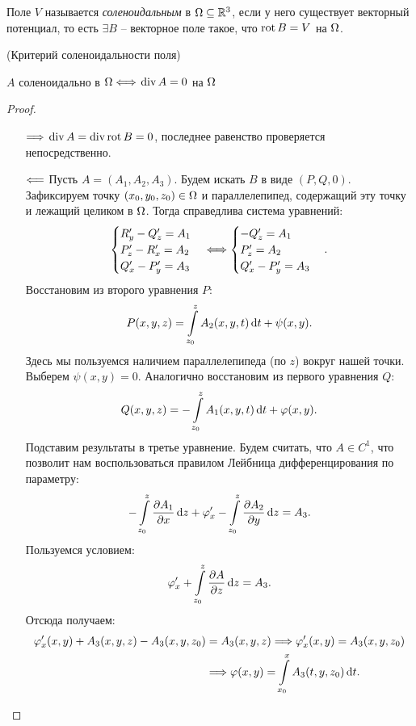 \begin{definition}
    Поле $V$ называется \textit{соленоидальным} в $\Omega \subseteq \mathbb{R}^3$, 
    если у него существует векторный потенциал, то есть
    $\exists B$ -- векторное поле такое, что $\operatorname{rot} B = V$ на $\Omega$.
\end{definition}

\begin{theorem}(Критерий соленоидальности поля)
    
    $A$ соленоидально в $\Omega \Longleftrightarrow$ $\operatorname{div} A = 0$ на $\Omega$
\end{theorem}
\begin{proof}
    \enewline
    \begin{itemize}
        \item[$\Longrightarrow$] $\operatorname{div}{A} = \operatorname{div}{\operatorname{rot}{B}} = 0$, последнее равенство проверяется непосредственно.
        \item[$\Longleftarrow$] Пусть $A = (A_1, A_2, A_3)$. Будем искать $B$ в виде $(P, Q, 0)$. Зафиксируем точку
            $(x_0, y_0, z_0) \in \Omega$ и параллелепипед, содержащий эту точку и лежащий целиком в $\Omega$.
            Тогда справедлива система уравнений:
            \[
                \begin{cases}
                    R'_y - Q'_z = A_1 \\
                    P'_z - R'_x = A_2 \\
                    Q'_x - P'_y = A_3 
                \end{cases} \Longleftrightarrow
                \begin{cases}
                    -Q'_z = A_1 \\
                    P'_z = A_2 \\
                    Q'_x - P'_y = A_3
                \end{cases}
            .\]
            Восстановим из второго уравнения $P$:
            \[
                P(x, y, z) = \int\limits_{z_0}^z{A_2(x, y, t) \,\mathrm{d} t} + \psi(x, y)
            .\]
            Здесь мы пользуемся наличием параллелепипеда (по $z$) вокруг нашей точки. Выберем $\psi(x, y) = 0$. 
            Аналогично восстановим из первого уравнения $Q$:
            \[
                Q(x, y, z) = -\int\limits_{z_0}^z{A_1(x, y, t) \,\mathrm{d} t} + \varphi(x, y)
            .\]
            Подставим результаты в третье уравнение. Будем считать, что $A \in C^1$, 
            что позволит нам воспользоваться правилом Лейбница дифференцирования по параметру:
            \[
                -\int\limits_{z_0}^z{\dfrac{\partial A_1}{\partial x} \,\mathrm{d} z} + \varphi'_x - \int\limits_{z_0}^z{\dfrac{\partial A_2}{\partial y} \,\mathrm{d} z} = A_3
            .\]
            Пользуемся условием:
            \[
                \varphi'_x + \int\limits_{z_0}^z{\dfrac{\partial A}{\partial z} \,\mathrm{d} z} = A_3
            .\]
            Отсюда получаем:
            \begin{align*}
                \varphi'_x(x, y) + A_3(x, y, z) - A_3(x, y, z_0) &= A_3(x, y, z) \Longrightarrow
                \varphi'_x(x, y) = A_3(x, y, z_0) \\
                &\Longrightarrow \varphi(x, y) = \int\limits_{x_0}^x{A_3(t, y, z_0) \,\mathrm{d} t}
            .\end{align*}
    \end{itemize}
\end{proof}

